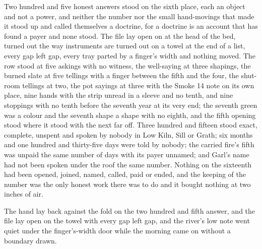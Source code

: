 Two hundred and five honest answers stood on the sixth place, each an object and not a power, and neither the number nor the small hand-movings that made it stood up and called themselves a doctrine, for a doctrine is an account that has found a payer and none stood. The file lay open on  at the head of the bed, turned out the way instruments are turned out on a towel at the end of a list, every gap left gap, every tray parted by a finger's width and nothing moved. The row stood at five askings with no witness, the well-saying at three shapings, the burned slate at five tellings with a finger between the fifth and the four, the shut-room tellings at two, the pot sayings at three with the Smoke 14 note on its own place, nine hands with the strip unread in a sleeve and no tenth, and nine stoppings with no tenth before the seventh year at its very end; the seventh green was a colour and the seventh shape a shape with no eighth, and the fifth opening stood where it stood with the next far off. Three hundred and fifteen stood exact, complete, unspent and spoken by nobody in Low Kiln, Sill or Grath; six months and one hundred and thirty-five days were told by nobody; the carried fire's fifth was unpaid the same number of days with its payer unnamed; and Garl's name had not been spoken under the roof the same number. Nothing on the sixteenth had been opened, joined, named, called, paid or ended, and the keeping of the number was the only honest work there was to do and it bought nothing at two inches of air.

The hand lay back against the fold on the two hundred and fifth answer, and the file lay open on the towel with every gap left gap, and the river's low note went quiet under the finger's-width door while the morning came on without a boundary drawn.
